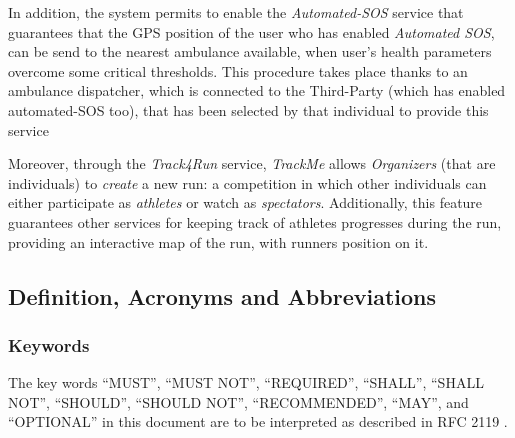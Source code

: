 \documentclass[a4paper]{article}
\begin{document}
    In addition, the system permits to enable the \textit{Automated-SOS} service that guarantees that the GPS position of the user who has enabled \textit{Automated SOS}, can be send to the nearest ambulance available, when user's health parameters overcome some critical thresholds. This procedure takes place thanks to an ambulance dispatcher, which is connected to the Third-Party (which has enabled automated-SOS too), that has been selected by that individual to provide this service
   
    Moreover, through  the \textit{Track4Run} service, \textit{TrackMe} allows \textit{Organizers} (that are individuals)  to  \textit{create}  a  new  run:  a  competition  in  which other individuals can either participate as \textit{athletes} or watch as \textit{spectators}.  Additionally, this feature guarantees other services for keeping track of athletes progresses during the run, providing an interactive map of the run, with runners position on it.
    
\subsection{Definition, Acronyms and  Abbreviations}
            \subsubsection{Keywords}
            The key words “MUST”, “MUST NOT”, “REQUIRED”, “SHALL”, “SHALL NOT”, “SHOULD”, “SHOULD NOT”, “RECOMMENDED”, “MAY”, and “OPTIONAL” in this document are to be interpreted as described in RFC 2119 \cite{bradner1997key}.
            
\end{document}
